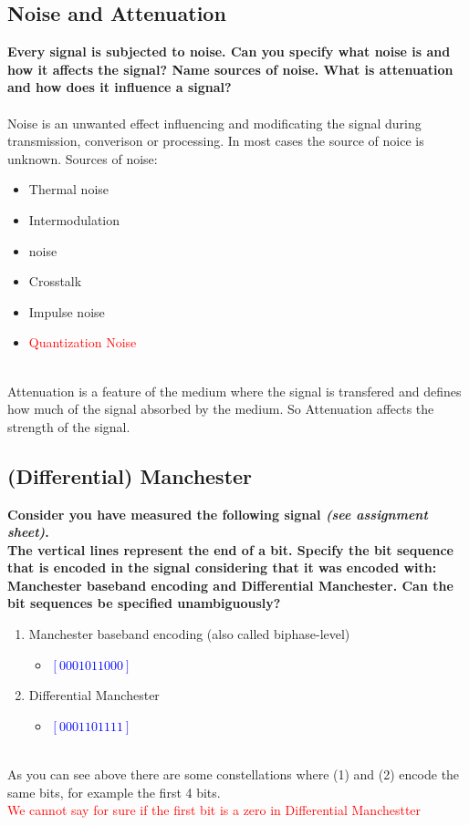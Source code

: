 \documentclass[a4paper,12pt]{article}
\begin{document}
\subsection{Noise and Attenuation}
\textbf{Every signal is subjected to noise.  Can you specify what noise is and how it affects the signal? Name sources of noise.  What is attenuation and how does it influence a signal?}\\
\\
Noise is an unwanted effect influencing and modificating the signal during transmission, converison or processing. In most cases the source of noice is unknown. Sources of noise:
\begin{itemize}[itemsep=0pt]
	\item Thermal noise
	\item Intermodulation
	\item noise
	\item Crosstalk
	\item Impulse noise
    \item \textcolor{red}{Quantization Noise}
\end{itemize}
\\
Attenuation is a feature of the medium where the signal is transfered and defines how much of the signal absorbed by the medium. So Attenuation affects the strength of the signal.

\pagebreak
\subsection{(Differential) Manchester}
\textbf{Consider you have measured the following signal \textit{(see assignment sheet)}.\\
The vertical lines represent the end of a bit.  Specify the bit sequence that is encoded in the signal considering that it was encoded with: Manchester baseband encoding and Differential Manchester. Can the bit sequences be specified unambiguously?}

\begin{enumerate}[itemsep=0pt]
	\item Manchester baseband encoding (also called biphase-level)
	\begin{itemize}
		\item \textcolor{blue}{$[0001011000]$}
	\end{itemize}
	\item Differential Manchester
	\begin{itemize}
		\item \textcolor{blue}{$[0001101111]$}
	\end{itemize}
\end{enumerate}
\\
As you can see above there are some constellations where (1) and (2) encode the same bits, for example the first 4 bits.
\\
\textcolor{red}{We cannot say for sure if the first bit is a zero in Differential Manchestter}
	
\end{document}

